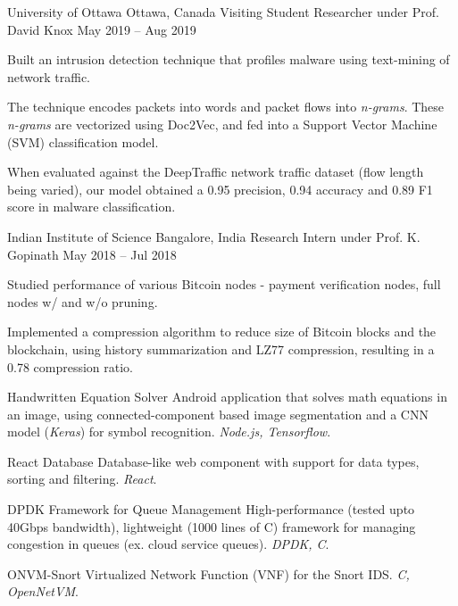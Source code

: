 \documentclass[11pt,a4paper]{article}
\begin{document}
\headedsection
{University of Ottawa}
{Ottawa, Canada}
{Visiting Student Researcher under Prof. David Knox}
{May 2019 -- Aug 2019}{
	\begin{circlist}
		\item Built an intrusion detection technique that profiles malware using text-mining of network traffic.
		\item The technique encodes packets into words and packet flows into \textit{n-grams}. These \textit{n-grams} are vectorized using Doc2Vec, and fed into a Support Vector Machine (SVM) classification model.
		\item When evaluated against the DeepTraffic network traffic dataset (flow length being varied), our model obtained a 0.95 precision, 0.94 accuracy and 0.89 F1 score in malware classification.
	\end{circlist}
}

\headedsection
{Indian Institute of Science}
{Bangalore, India}
{Research Intern under Prof. K. Gopinath}
{May 2018 -- Jul 2018}{
	\begin{circlist}
		\item Studied performance of various Bitcoin nodes - payment verification nodes, full nodes w/ and w/o pruning.
		\item Implemented a compression algorithm to reduce size of Bitcoin blocks and the blockchain, using history summarization and LZ77 compression, resulting in a 0.78 compression ratio.
	\end{circlist}
}


\headedsectiontwo
{Handwritten Equation Solver}{}{}
{
	Android application that solves math equations in an image, using connected-component based image segmentation and a CNN model (\textit{Keras}) for symbol recognition. \textit{Node.js, Tensorflow}.
}

\headedsectiontwo
{React Database}{}{}
{
	Database-like web component with support for data types, sorting and filtering. \textit{React}.
}

\headedsectiontwo
{DPDK Framework for Queue Management}{}{}
{
	High-performance (tested upto 40Gbps bandwidth), lightweight (1000 lines of C) framework for managing congestion in queues (ex. cloud service queues). \textit{DPDK, C}.
}

\headedsectiontwo
{ONVM-Snort}{}{}
{
	Virtualized Network Function (VNF) for the Snort IDS. \textit{C, OpenNetVM}.
}
\end{document}
